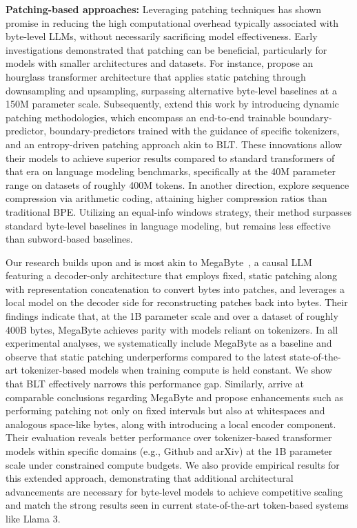 \textbf{Patching-based approaches:} Leveraging patching techniques has shown promise in reducing the high computational overhead typically associated with byte-level LLMs, without necessarily sacrificing model effectiveness. Early investigations demonstrated that patching can be beneficial, particularly for models with smaller architectures and datasets. For instance, \cite{nawrot-etal-2022-hierarchical} propose an hourglass transformer architecture that applies static patching through downsampling and upsampling, surpassing alternative byte-level baselines at a 150M parameter scale. Subsequently, \cite{nawrot-etal-2023-efficient} extend this work by introducing dynamic patching methodologies, which encompass an end-to-end trainable boundary-predictor, boundary-predictors trained with the guidance of specific tokenizers, and an entropy-driven patching approach akin to {\textsc BLT}. These innovations allow their models to achieve superior results compared to standard transformers of that era on language modeling benchmarks, specifically at the 40M parameter range on datasets of roughly 400M tokens. In another direction, \cite{lester2024training} explore sequence compression via arithmetic coding, attaining higher compression ratios than traditional BPE. Utilizing an equal-info windows strategy, their method surpasses standard byte-level baselines in language modeling, but remains less effective than subword-based baselines.

Our research builds upon and is most akin to MegaByte~\citep{yu2023megabyte}, a causal LLM featuring a decoder-only architecture that employs fixed, static patching along with representation concatenation to convert bytes into patches, and leverages a local model on the decoder side for reconstructing patches back into bytes. Their findings indicate that, at the 1B parameter scale and over a dataset of roughly 400B bytes, MegaByte achieves parity with models reliant on tokenizers. In all experimental analyses, we systematically include MegaByte as a baseline and observe that static patching underperforms compared to the latest state-of-the-art tokenizer-based models when training compute is held constant. We show that {\textsc BLT} effectively narrows this performance gap. Similarly, \cite{slagle2024spacebyte} arrive at comparable conclusions regarding MegaByte and propose enhancements such as performing patching not only on fixed intervals but also at whitespaces and analogous space-like bytes, along with introducing a local encoder component. Their evaluation reveals better performance over tokenizer-based transformer models within specific domains (e.g., Github and arXiv) at the 1B parameter scale under constrained compute budgets. We also provide empirical results for this extended approach, demonstrating that additional architectural advancements are necessary for byte-level models to achieve competitive scaling and match the strong results seen in current state-of-the-art token-based systems like Llama 3.

